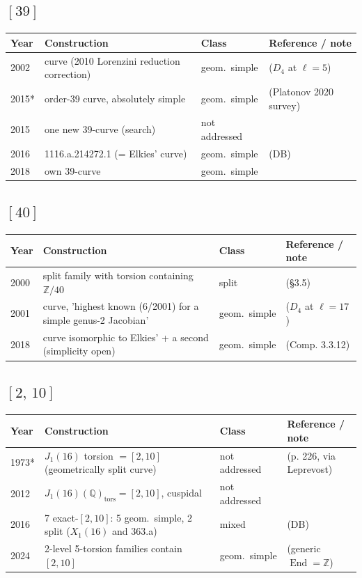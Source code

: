 \documentclass[10pt]{amsart}
\begin{document}
\subsection*{$[39]$}
\begin{longtable}{p{0.9cm} p{7.6cm} p{2.3cm} p{4.2cm}}
\hline Year & Construction & Class & Reference / note \\ \hline
2002 & curve (2010 Lorenzini reduction correction) & geom.\ simple & \cite{Elkies2002} ($D_4$ at $\ell{=}5$)\\
2015* & order-39 curve, absolutely simple & geom.\ simple & \cite{PP2015} (Platonov 2020 survey)\\
2015 & one new 39-curve (search) & not addressed & \cite{Howe2015}\\
2016 & 1116.a.214272.1 (= Elkies' curve) & geom.\ simple & \cite{BSSVY} (DB)\\
2018 & own 39-curve & geom.\ simple & \cite{Nicholls2018}\\
\hline\end{longtable}
\subsection*{$[40]$}
\begin{longtable}{p{0.9cm} p{7.6cm} p{2.3cm} p{4.2cm}}
\hline Year & Construction & Class & Reference / note \\ \hline
2000 & split family with torsion containing $\mathbb{Z}/40$ & split & \cite{HLP2000} (\S3.5)\\
2001 & curve, 'highest known (6/2001) for a simple genus-2 Jacobian' & geom.\ simple & \cite{Elkies2002} ($D_4$ at $\ell{=}17$)\\
2018 & curve isomorphic to Elkies' + a second (simplicity open) & geom.\ simple & \cite{Nicholls2018} (Comp. 3.3.12)\\
\hline\end{longtable}
\subsection*{$[2,\,10]$}
\begin{longtable}{p{0.9cm} p{7.6cm} p{2.3cm} p{4.2cm}}
\hline Year & Construction & Class & Reference / note \\ \hline
1973* & $J_1(16)$ torsion $= [2,10]$ (geometrically split curve) & not addressed & \cite{Ogg1973} (p. 226, via Leprevost)\\
2012 & $J_1(16)(\mathbb{Q})_{\mathrm{tors}} = [2,10]$, cuspidal & not addressed & \cite{KamiennyNajman2012}\\
2016 & 7 exact-$[2,10]$: 5 geom.\ simple, 2 split ($X_1(16)$ and 363.a) & mixed & \cite{BSSVY} (DB)\\
2024 & 2-level 5-torsion families contain $[2,10]$ & geom.\ simple & \cite{Elkies2024} (generic $\operatorname{End}=\mathbb{Z}$)\\
\hline\end{longtable}
\end{document}
